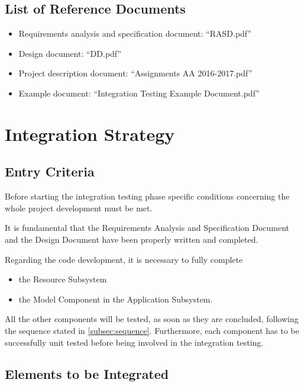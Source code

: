\documentclass[english]{article}
\begin{document}
\subsection{List of Reference Documents}

\begin{itemize}
	\item{Requirements analysis and specification document: “RASD.pdf”}
	\item{Design document: “DD.pdf”}
	\item{Project description document: “Assignments AA 2016-2017.pdf”}
	\item{Example document: “Integration Testing Example Document.pdf”}
\end{itemize}

\newpage
\section{Integration Strategy}

\subsection{Entry Criteria}

Before starting the integration testing phase specific conditions concerning the whole project development must be met.

It is fundamental that the Requirements Analysis and Specification Document and the Design Document have been properly written and completed.

Regarding the code development, it is necessary to fully complete 
\begin{itemize}
\item the Resource Subsystem
\item the Model Component in the Application Subsystem.
\end{itemize}
All the other components will be tested, as soon as they are concluded, following the sequence stated in \autoref{subsec:sequence}.
Furthermore, each component has to be successfully unit tested before being involved in the integration testing.


\subsection{Elements to be Integrated}
\end{document}
